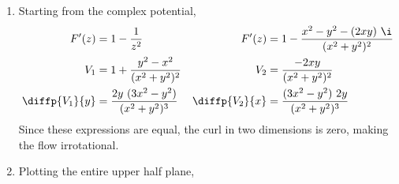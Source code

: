 \begin{enumerate}
    \item Starting from the complex potential,
          \begin{align}
              F'(z) & = 1 - \frac{1}{z^2}                               &
              F'(z) & = 1 - \frac{x^2 - y^2 - (2xy)\ \i}{(x^2 + y^2)^2}   \\
              V_1   & = 1 + \frac{y^2 - x^2}{(x^2 + y^2)^2}             &
              V_2   & = \frac{-2xy}{(x^2 + y^2)^2}                        \\
              \diffp{V_1}{y}
                    & = \frac{2y\ (3x^2 - y^2)}{(x^2 + y^2)^3}          &
              \diffp{V_2}{x}
                    & = \frac{(3x^2 - y^2)\ 2y}{(x^2 + y^2)^3}
          \end{align}
          Since these expressions are equal, the curl in two dimensions is zero, making
          the flow irrotational.

    \item Plotting the entire upper half plane,
          \begin{figure}[H]
              \centering
          \end{figure}


\end{enumerate}

